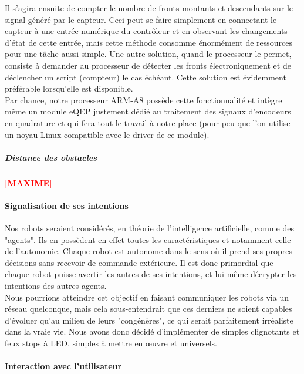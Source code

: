 				Il s'agira ensuite de compter le nombre de fronts montants et descendants sur le signal généré par le capteur.
				Ceci peut se faire simplement en connectant le capteur à une entrée numérique du contrôleur et en observant les changements d'état de cette entrée, mais cette méthode consomme énormément de ressources pour une tâche aussi simple. Une autre solution, quand le processeur le permet, consiste à demander au processeur de détecter les fronts électroniquement et de déclencher un script (compteur) le cas échéant. Cette solution est évidemment préférable lorsqu'elle est disponible.\\

				Par chance, notre processeur ARM-A8 possède cette fonctionnalité et intègre même un module eQEP\cite{bib12} \label{eQEP} justement dédié au traitement des signaux d'encodeurs en quadrature et qui fera tout le travail à notre place (pour peu que l'on utilise un noyau Linux compatible avec le driver de ce module).

			\subparagraph*{Distance des obstacles}

				\textbf{\huge{\textcolor{red}{[MAXIME]}}}

		\paragraph{Signalisation de ses intentions}

			Nos robots seraient considérés, en théorie de l'intelligence artificielle, comme des "agents". Ils en possèdent en effet toutes les caractéristiques et notamment celle de l'autonomie. Chaque robot est autonome dans le sens où il prend ses propres décisions sans recevoir de commande extérieure. Il est donc primordial que chaque robot puisse avertir les autres de ses intentions, et lui même décrypter les intentions des autres agents.\\

			Nous pourrions atteindre cet objectif en faisant communiquer les robots via un réseau quelconque, mais cela sous-entendrait que ces derniers ne soient capables d'évoluer qu'au milieu de leurs "congénères", ce qui serait parfaitement irréaliste dans la vraie vie. Nous avons donc décidé d'implémenter de simples clignotants et feux stops à LED, simples à mettre en œuvre et universels.

		\paragraph{Interaction avec l'utilisateur}

